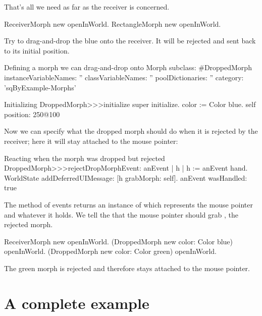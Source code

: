 \documentclass[a4paper,10pt,twoside]{book}
\begin{document}
That's all we need as far as the receiver is concerned.

\begin{code}{}
ReceiverMorph new openInWorld.
RectangleMorph new openInWorld.
\end{code}
\noindent
Try to drag-and-drop the blue  onto the receiver. It will be rejected and sent back to its initial position.

\begin{classdef}{Defining a morph we can drag-and-drop onto }
Morph subclass: #DroppedMorph
   instanceVariableNames: ''
   classVariableNames: ''
   poolDictionaries: ''
   category: 'sqByExample-Morphs'
\end{classdef}

\begin{method}{Initializing }
DroppedMorph>>>initialize
   super initialize.
   color := Color blue.
   self position: 250@100
\end{method}

Now we can specify what the dropped morph should do when it is rejected by the receiver; here it will stay attached to the mouse pointer:
\begin{method}{Reacting when the morph was dropped but rejected}
DroppedMorph>>>rejectDropMorphEvent: anEvent
   | h |
   h := anEvent hand.
   WorldState
      addDeferredUIMessage: [h grabMorph: self].
   anEvent wasHandled: true
\end{method}

The  method of events returns an instance of  which represents the mouse pointer and whatever it holds.
We tell the  that the mouse pointer should grab , the rejected morph.

\begin{code}{}
ReceiverMorph new openInWorld.
(DroppedMorph new color: Color blue) openInWorld.
(DroppedMorph new color: Color green) openInWorld.
\end{code}
\noindent
The green morph is rejected and therefore stays attached to the mouse pointer.

\section{A complete example}
\end{document}

